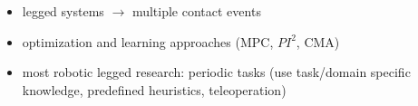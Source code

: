 \documentclass[11pt]{beamer}
\begin{document}
\begin{frame}
     \begin{itemize}\small \addtolength{\itemsep}{0.1ex}
      \item legged systems $\rightarrow$ multiple contact events 
      \item optimization and learning approaches (MPC, $PI^{2}$, CMA)
      \item most robotic legged research: periodic tasks  
      (use task/domain specific knowledge, predefined heuristics, teleoperation) 
     \end{itemize}
     

\end{frame}
\end{document}
